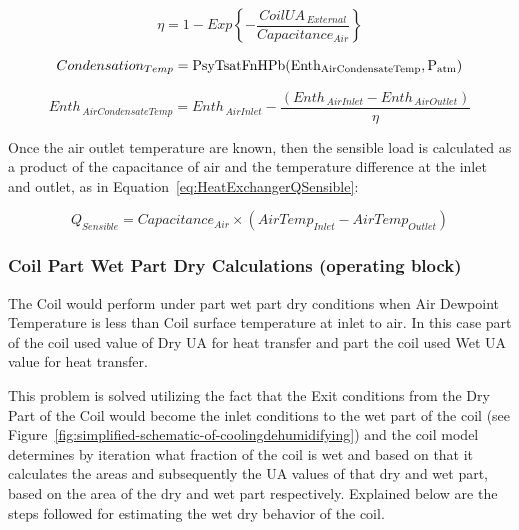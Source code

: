 \begin{equation}
\eta  = 1 - Exp\left\{ { - \frac{{CoilU{A_{\,External}}}}{{Capacitanc{e_{Air}}}}} \right\}
\label{eq:EtaWithCondensation}
\end{equation}

\begin{equation}
Condensatio{n_{Temp}} = {\rm{PsyTsatFnHPb(Ent}}{{\rm{h}}_{{\rm{AirCondensateTemp}}}}{\rm{,P_{atm}) }}
\label{eq:CondensationTemp}
\end{equation}

\begin{equation}
Ent{h_{\,AirCondensateTemp}} = Ent{h_{\,AirInlet}} - \frac{{\left( {Ent{h_{\,AirInlet}} - Ent{h_{\,AirOutlet}}} \right)}}{\eta }
\end{equation}

Once the air outlet temperature are known, then the sensible load is calculated as a product of the capacitance of air and the temperature difference at the inlet and outlet, as in Equation~\ref{eq:HeatExchangerQSensible}:

\begin{equation}
{Q_{Sensible}} = Capacitanc{e_{Air}} \times \left( {AirTem{p_{Inlet}} - AirTem{p_{Outlet}}} \right)
\label{eq:HeatExchangerQSensible}
\end{equation}

\subsubsection{Coil Part Wet Part Dry Calculations (operating block)}\label{coil-part-wet-part-dry-calculations-operating-block}

The Coil would perform under part wet part dry conditions when Air Dewpoint Temperature is less than Coil surface temperature at inlet to air. In this case part of the coil used value of Dry UA for heat transfer and part the coil used Wet UA value for heat transfer.

This problem is solved utilizing the fact that the Exit conditions from the Dry Part of the Coil would become the inlet conditions to the wet part of the coil (see Figure~\ref{fig:simplified-schematic-of-coolingdehumidifying}) and the coil model determines by iteration what fraction of the coil is wet and based on that it calculates the areas and subsequently the UA values of that dry and wet part, based on the area of the dry and wet part respectively. Explained below are the steps followed for estimating the wet dry behavior of the coil.

